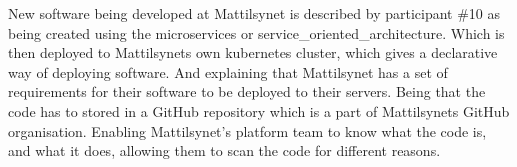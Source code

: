 
New software being developed at Mattilsynet is described by participant \#10 as being created using the \gls{microservices} or \gls{service_oriented_architecture}. Which is then deployed to Mattilsynets own \gls{kubernetes} cluster, which gives a declarative way of deploying software. And explaining that Mattilsynet has a set of requirements for their software to be deployed to their servers. Being that the code has to stored in a GitHub repository which is a part of Mattilsynets GitHub organisation. Enabling Mattilsynet's platform team to know what the code is, and what it does, allowing them to scan the code for different reasons.




